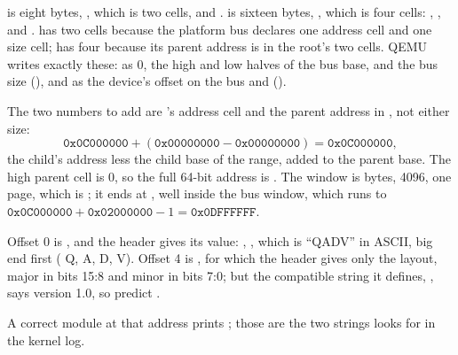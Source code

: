 
  is eight bytes, , which is two cells,
 and .  is sixteen bytes,
, which is four cells: ,
,  and .  has two cells because the
platform bus declares one address cell and one size cell;  has four because its
parent address is in the root's two cells. QEMU writes exactly these:  as 0, the high
and low halves of the bus base, and the bus size (), and  as
the device's offset on the bus and  ().

 The two numbers to add are 's address cell and the parent address in
, not either size:
\[
  \texttt{0x0C000000} + (\texttt{0x00000000} - \texttt{0x00000000}) = \texttt{0x0C000000},
\]
the child's address less the child base of the range, added to the parent base. The high parent
cell is 0, so the full 64-bit address is . The window is 
bytes, 4096, one page, which is ; it ends at , well inside
the bus window, which runs to $\texttt{0x0C000000} + \texttt{0x02000000} - 1 =
\texttt{0x0DFFFFFF}$.

 Offset 0 is , and the header gives its value: ,
, which is ``QADV'' in ASCII, big end first ( Q,  A,
 D,  V). Offset 4 is , for which the header gives only
the layout, major in bits 15:8 and minor in bits 7:0; but the compatible string it defines,
, says version 1.0, so predict .

 A correct module at that address prints ; those are
the two strings  looks for in the kernel log.

